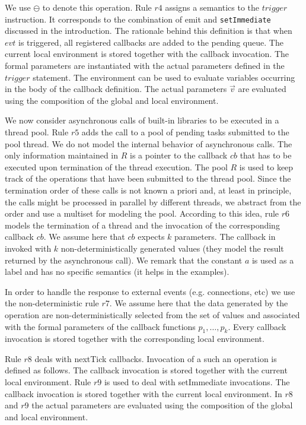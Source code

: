 We use $\ominus$ to denote this operation.
Rule $r4$ assigns a semantics to the $trigger$ instruction. It corresponds to the combination of emit and \verb+setImmediate+ discussed in the introduction.
The rationale behind this definition is that when $evt$ is triggered, all registered callbacks are added to the pending queue. 
The current local environment is stored together with the callback invocation.
The formal parameters are instantiated with the actual parameters defined in the $trigger$ statement.
The environment can be used to evaluate variables occurring in the body of the callback definition.
The actual parameters $\vec{v}$ are evaluated using the composition of the global and local environment.

We now consider asynchronous calls of built-in libraries to be executed in a thread pool.
Rule $r5$ adds the call to a pool of pending tasks submitted to the pool thread.
We do not model the internal behavior of asynchronous calls. 
The only information maintained in $R$ is a pointer to the callback $cb$ that has to be executed upon 
termination of the thread execution.
The pool $R$ is used to keep track of the operations that have been submitted to the thread pool.
Since the termination order of these calls is not known a priori and, at least in principle, the calls might be processed in parallel by different threads, we abstract from the order and use a multiset for modeling the pool.
According to this idea, rule $r6$ models the termination of a thread and the invocation of 
the corresponding callback $cb$. We assume  here that $cb$ expects $k$ parameters.
The callback in invoked with $k$ non-deterministically generated values 
(they model the result returned by the asynchronous call).
We remark that the constant $a$ is used as a label and has no specific semantics (it helps in the examples).
%

In order to handle the response to external events (e.g. connections, etc) we use the non-deterministic rule $r7$.
We assume here that the data generated by the operation are non-deterministically selected from 
the set of values and associated with the formal parameters of the callback functions $p_1,\ldots,p_k$.  
Every callback invocation is stored together with the corresponding local environment.

Rule $r8$ deals with nextTick callbacks.
Invocation of a such an operation is defined as follows.
The callback invocation is stored together with the current local environment.
Rule $r9$ is used to deal with setImmediate invocations.
The  callback invocation is stored together with the current local environment.
In $r8$ and $r9$ the actual parameters are evaluated using the composition of the global and local environment.
%

